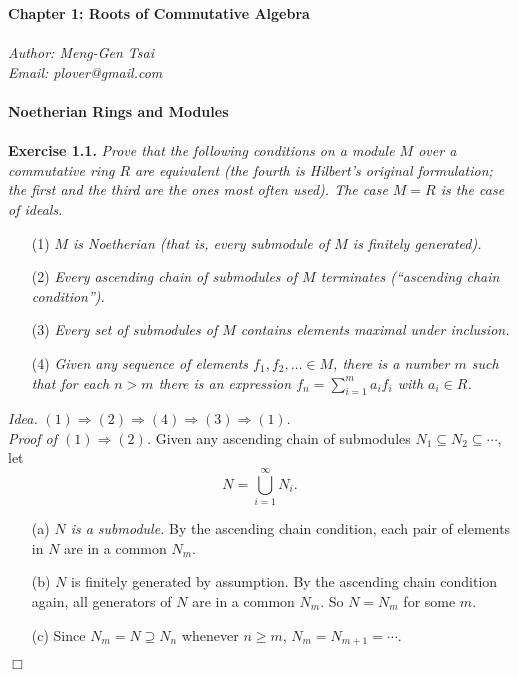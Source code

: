 \documentclass{article}
\begin{document}
\textbf{\Large Chapter 1: Roots of Commutative Algebra} \\\\



\emph{Author: Meng-Gen Tsai} \\
\emph{Email: plover@gmail.com} \\\\









\textbf{\large Noetherian Rings and Modules} \\\\



\textbf{Exercise 1.1.}
\emph{Prove that the following conditions on a module $M$ over a commutative ring $R$
are equivalent (the fourth is Hilbert's original formulation;
the first and the third are the ones most often used).
The case $M = R$ is the case of ideals.}
\begin{enumerate}
\item[(1)]
\emph{$M$ is Noetherian (that is, every submodule of $M$ is finitely generated).}
\item[(2)]
\emph{Every ascending chain of submodules of $M$ terminates
(``ascending chain condition'').}
\item[(3)]
\emph{Every set of submodules of $M$ contains elements maximal under inclusion.}
\item[(4)]
\emph{Given any sequence of elements $f_1, f_2, \ldots \in M$,
there is a number $m$ such that for each $n > m$ there is an expression
$f_n = \sum_{i=1}^{m} a_i f_i$ with $a_i \in R$.} \\
\end{enumerate}

\emph{Idea.}
$(1) \Rightarrow (2) \Rightarrow (4) \Rightarrow (3) \Rightarrow (1)$. \\

\emph{Proof of $(1) \Rightarrow (2)$.}
Given any ascending chain of submodules $N_1 \subseteq N_2 \subseteq \cdots$,
let $$N = \bigcup_{i=1}^{\infty} N_i.$$
\begin{enumerate}
\item[(a)]
\emph{$N$ is a submodule.}
By the ascending chain condition, each pair of elements in $N$ are in a common $N_m$.
\item[(b)]
$N$ is finitely generated by assumption.
By the ascending chain condition again, all generators of $N$ are in a common $N_m$.
So $N = N_m$ for some $m$.
\item[(c)]
Since $N_m = N \supseteq N_n$ whenever $n \geq m$,
$N_m = N_{m+1} = \cdots$.
\end{enumerate}
$\Box$ \\
\end{document}

